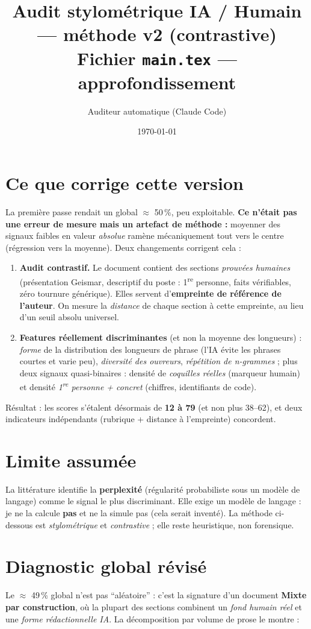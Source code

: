 \documentclass[11pt,a4paper]{article}
\title{Audit stylométrique IA / Humain --- \textbf{méthode v2 (contrastive)}\\
\large Fichier \texttt{main.tex} --- approfondissement}
\author{Auditeur automatique (Claude Code)}
\date{\today}
\begin{document}
\maketitle

\section{Ce que corrige cette version}
La première passe rendait un global $\approx$ 50\,\%, peu exploitable. \textbf{Ce n'était
pas une erreur de mesure mais un artefact de méthode :} moyenner des signaux faibles en
valeur \emph{absolue} ramène mécaniquement tout vers le centre (régression vers la
moyenne). Deux changements corrigent cela :
\begin{enumerate}[]
  \item \textbf{Audit contrastif.} Le document contient des sections \emph{prouvées
  humaines} (présentation Geismar, descriptif du poste : 1\textsuperscript{re} personne,
  faits vérifiables, zéro tournure générique). Elles servent d'\textbf{empreinte de
  référence de l'auteur}. On mesure la \emph{distance} de chaque section à cette empreinte,
  au lieu d'un seuil absolu universel.
  \item \textbf{Features réellement discriminantes} (et non la moyenne des longueurs) :
  \emph{forme} de la distribution des longueurs de phrase (l'IA évite les phrases
  courtes et varie peu), \emph{diversité des ouvreurs}, \emph{répétition de n-grammes} ;
  plus deux signaux quasi-binaires : densité de \emph{coquilles réelles} (marqueur humain)
  et densité \emph{1\textsuperscript{re} personne + concret} (chiffres, identifiants de code).
\end{enumerate}
Résultat : les scores s'étalent désormais de \textbf{12 à 79} (et non plus 38--62), et
deux indicateurs indépendants (rubrique + distance à l'empreinte) concordent.

\section{Limite assumée}
La littérature identifie la \textbf{perplexité} (régularité probabiliste sous un modèle de
langage) comme le signal le plus discriminant. Elle exige un modèle de langage : je ne la
calcule \textbf{pas} et ne la simule pas (cela serait inventé). La méthode ci-dessous est
\emph{stylométrique} et \emph{contrastive} ; elle reste heuristique, non forensique.

\section{Diagnostic global révisé}
Le $\approx$ 49\,\% global n'est pas \enquote{aléatoire} : c'est la signature d'un document
\textbf{Mixte par construction}, où la plupart des sections combinent un \emph{fond humain
réel} et une \emph{forme rédactionnelle IA}. La décomposition par volume de prose le montre :
\end{document}
